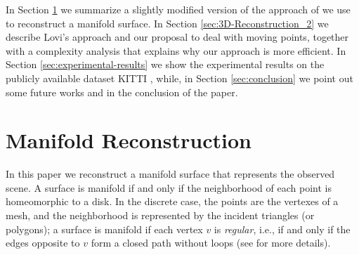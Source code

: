 In Section \ref{sec:manifold_2} we summarize a slightly modified version of the approach of \cite{litvinov_lhuillier_13} we use to reconstruct a manifold surface.
In Section \ref{sec:3D-Reconstruction_2} we describe Lovi's approach \cite{Lovi_et_al_11} and our proposal to deal with moving points, together with a complexity analysis that explains why our approach is more efficient. 
In Section \ref{sec:experimental-results} we show the experimental results on the publicly available dataset KITTI \cite{Geiger_et_al12}, while, in Section \ref{sec:conclusion} we point out some future works and in  the conclusion of the paper.

\section{Manifold Reconstruction} %
\label{sec:manifold_2}
In this paper we reconstruct a manifold surface that represents the observed scene. 
A surface is manifold if and only if the neighborhood of each point is homeomorphic to a disk. 
In the discrete case, the points are the vertexes of a mesh, and the neighborhood is represented by the incident triangles (or polygons); a surface is manifold if each vertex $v$ is \emph{regular}, i.e., if and only if the edges opposite to $v$ form a closed path without loops  (see \cite{litvinov_lhuillier_13} for more details). 

% 
% 


